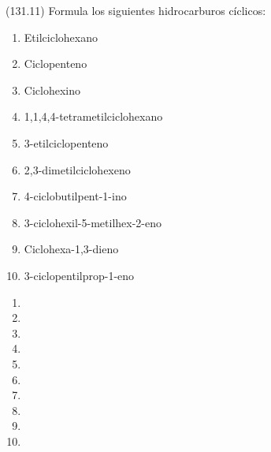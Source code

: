   \begin{exercise}[
      tags    = {},
      topics  = {química, química orgánica, orgánica},
      source  = {FQ 1B MGH 2016, p131, e11},
    ]
    (131.11) Formula los siguientes hidrocarburos cíclicos:
    \begin{enumerate}
      \item Etilciclohexano
      \item Ciclopenteno
      \item Ciclohexino
      \item 1,1,4,4-tetrametilciclohexano
      \item 3-etilciclopenteno
      \item 2,3-dimetilciclohexeno
      \item 4-ciclobutilpent-1-ino
      \item 3-ciclohexil-5-metilhex-2-eno
      \item Ciclohexa-1,3-dieno
      \item 3-ciclopentilprop-1-eno
    \end{enumerate}
  \end{exercise}

  \begin{solution}
    \begin{enumerate}
      \item {}
      \item {}
      \item {}
      \item {}
      \item {}
      \item {}
      \item {}
      \item {}
      \item {}
      \item {}
    \end{enumerate}
  \end{solution}




